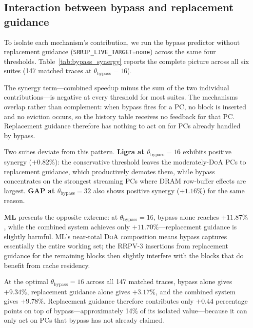 \documentclass[conference]{IEEEtran}
\newcommand{\doa}{\textsc{DoA}\xspace}
\newcommand{\rrpv}{\textsc{RRPV}\xspace}
\begin{document}
\subsection{Interaction between bypass and replacement guidance}
\label{sec:synergy}

To isolate each mechanism's contribution, we run the bypass predictor without
replacement guidance (\texttt{SRRIP\_LIVE\_TARGET=none}) across the same four
thresholds. Table~\ref{tab:bypass_synergy} reports the complete picture across
all six suites (147 matched traces at $\theta_{\mathrm{bypass}}=16$).

The synergy term---combined speedup minus the sum of the two individual
contributions---is negative at every threshold for most suites. The mechanisms
overlap rather than complement: when bypass fires for a PC, no block is
inserted and no eviction occurs, so the history table receives no feedback for
that PC. Replacement guidance therefore has nothing to act on for PCs already
handled by bypass.

Two suites deviate from this pattern.
\textbf{Ligra at $\theta_{\mathrm{bypass}}=16$} exhibits positive synergy
($+0.82\%$): the conservative threshold leaves the moderately-\doa PCs to
replacement guidance, which productively demotes them, while bypass concentrates
on the strongest streaming PCs where DRAM row-buffer effects are largest.
\textbf{GAP at $\theta_{\mathrm{bypass}}=32$} also shows positive synergy
($+1.16\%$) for the same reason.

\textbf{ML} presents the opposite extreme: at $\theta_{\mathrm{bypass}}=16$,
bypass alone reaches $+11.87\%$, while the combined system achieves only
$+11.70\%$---replacement guidance is slightly harmful. ML's near-total \doa
composition means bypass captures essentially the entire working set; the
\rrpv-3 insertions from replacement guidance for the remaining blocks then
slightly interfere with the blocks that do benefit from cache residency.

At the optimal $\theta_{\mathrm{bypass}}=16$ across all 147 matched traces,
bypass alone gives $+9.34\%$, replacement guidance alone gives $+3.17\%$, and
the combined system gives $+9.78\%$. Replacement guidance therefore contributes
only $+0.44$ percentage points on top of bypass---approximately 14\% of its
isolated value---because it can only act on PCs that bypass has not already
claimed.
\end{document}
